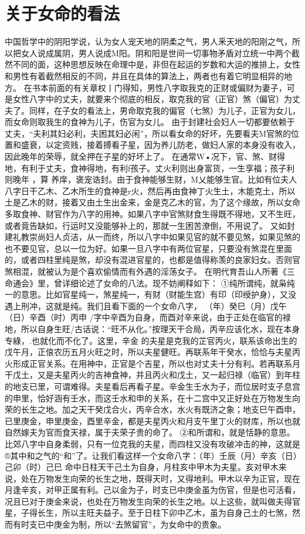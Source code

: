 \section{关于女命的看法}
中国哲学中的阴阳学说，认为女人宠天地的阴柔之气，男人釆天地的阳刚之气，所以把女人说成属阴，男人说成M阳。阴和阳是世间一切事物矛盾对立统一中两个截然不同的面，这种思想反映在命理中是，非但在起运的岁数和大运的推排上，女性和男性有着截然相反的不同，并且在具体的算法上，两者也有着它明显相异的地方。
在书本前面的有关章权丨门得知，男性八字取我克的正财或偏财为妻子，可是女性八字中的丈夫，就要来个彻底的相反，取克我的官（正官）煞（偏官）为丈夫了。同样，在子女的看法上，男命取克我的偏官（七煞）为儿子，正官为女儿，而女命则取我生的食神为儿子，伤官为女儿。
由于封建社会妇人一切都要依赖于丈夫，“夫利其妇必利，夫困其妇必闲”，所以看女命的好坏，先要看夫M官煞的位置和盛衰，以定资贱，接着搏看子星，因为养儿防老，做妇人家的本身没有收入，因此晚年的荣辱，就全押在子星的好坏上了。
在通常W•况下，官、煞、财得地，有利于丈夫，食神得地，有利f孩子。丈火利则出身富货，一生享福；孩子利则晚年
，算
养庠，褒宠诰封。由于食神能够生财，M乂能够生官。比如有位夫人八字日干乙木、乙木所生的食神是r火，然后再由食神丁火生土，木能克土，所以土是乙木的财，接着又由土生出金来，金是克乙木的官，为了这个缘故，所以女命多取食神、财官作为八字的用神。如果八字中官煞财食生得既不得地，又不生旺，或者竟告缺如，行运时又没能够补上的，那就一生困苦潦倒，不用说了。
又如封建礼教崇尚妇人贞洁，从一而终，所以八字中如果见官的就不要见煞，如果见煞的也不要见官，总以一位为好。如果一旦八字中有两位官星，只要没有煞混在里面的，或者四柱里纯是煞，却没有混进官星的，也都是值得称羡的良家妇女。否则官煞相混，就被认为是个喜欢偷情而有外遇的淫荡女子。
在明代育吾山人所著《三命通会》里，曾详细论述了女命的八法。现不妨阐释如下：
①纯所谓纯，就枭纯一的意思。比如官星纯一，煞星纯一，有财（财能生宫）有印（印绶护身），又没遇上刑冲，这就是纯。我们且看下面的一个女命八字，
（年）癸巳（月）戊午（日）辛酉（时）丙申
/字中辛酉为自身，而酉对辛来说，由于正处在临官的禄地，所以自身生旺/古话说：“旺不从化。”按理天干合局，丙辛应该化水，现在本身专綠，.也就化而不化了。这里，辛金
的夫星是克我的芷官丙火，联系该命出生的戊午月，正偯农历五月火旺之时，所以夫星健旺。再联系年干癸水，恰恰与夫星丙火形成正官关系。在用神中，正官是个吉星，所以也对丈夫十分有利。若再联系月干戊土，又是夫星丙火的吉神食神，并且丙火和戊土，又一起归禄（临官）到年柱的地支已里，可谓难得。夫星看后再看子星。辛金生壬水为子，而位居时支子息宫的申里，恰好涵有壬水，而这壬水和申的关系，在十二宫中又正好处在万物发生向荣的长生之地。加之天干癸戊合火，丙辛合水，水火有既济之象；地支巳午酉申，已里庚金，申里庚金，酉里辛金，都是夫星丙火和月支午里丁火的财库，所以也就自然嫁夫为官而食天禄，属于夫荣子贵的命了。
②和所谓和，就是恬静的意思。比郊八字中自身柔弱，只有一位克我的夫星，而四柱又没有攻破冲击的神，这就是®其中和之气的“和”了。让我们看这样一个女命八字：（年）壬辰（月）辛亥（日）己卯（时）己巳
命中日柱天干己土为自身，月柱亥中甲木为夫星。亥对甲木来说，处在万物发生向荣的长生之地，既得天时，又得地利。甲木以辛为正官，现在月逢辛亥，对甲正属有利。己以金为子，时支已中庚金虽为伤官，但是也可活看，况且已对于庚金来说，也处在万物发生向荣的长生之地。以上这些，就叫做夫得官星，子得长生，所以主旺夫益子。至于日柱下卯中乙木，虽为自身己土的七煞，然而有时支已中庚金为制，所以“去煞留官”，为女命中的贵象。

